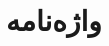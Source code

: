 \documentclass[oneside, 10pt, a4paper]{article}
\begin{document}
 
\maketitle 




 



\linespread{.8} %
\renewcommand{\url}[1]{\underline{#1}}

%
%

%
\newpage
\latin


\persian
\linespread{1} %

\section*{واژه‌نامه}
{
	\renewcommand{\section}[2]{} %
	\begin{RTL}
		\begin{multicols}{3}
			\theendnotes
		\end{multicols}
	\end{RTL}
}
\end{document}
